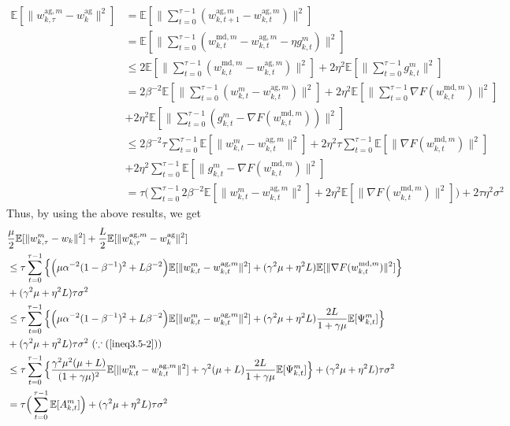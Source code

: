 \documentclass[11pt]{article}
\begin{document}
\begin{align*}
    \mathbb{E}[\|w_{k, \tau}^{\textrm{ag}, m} - w_k^{\textrm{ag}}\|^2] &= \mathbb{E}[\|\sum_{t=0}^{\tau-1}(w_{k, t+1}^{\textrm{ag}, m}-w_{k, t}^{\textrm{ag}, m})\|^2] \\
    &= \mathbb{E}[\|\sum_{t=0}^{\tau-1}(w_{k, t}^{\textrm{md}, m}-w_{k, t}^{\textrm{ag}, m}-\eta g_{k, t}^m)\|^2]\\
    &\leq 2\mathbb{E}[\|\sum_{t=0}^{\tau-1}(w_{k, t}^{\textrm{md}, m} - w_{k, t}^{\textrm{ag}, m})\|^2] + 2\eta^2\mathbb{E}[\|\sum_{t=0}^{\tau-1}g_{k, t}^m\|^2]\\
    &= 2\beta^{-2}\mathbb{E}[\|\sum_{t=0}^{\tau-1}(w_{k, t}^m - w_{k, t}^{\textrm{ag}, m})\|^2] + 2\eta^2\mathbb{E}[\|\sum_{t=0}^{\tau-1}\nabla F(w_{k, t}^{\textrm{md}, m})\|^2] \\
    &+ 2\eta^2\mathbb{E}[\|\sum_{t=0}^{\tau-1}(g_{k, t}^m - \nabla F(w_{k, t}^{\textrm{md}, m}))\|^2]\\
    &\leq 2\beta^{-2}\tau\sum_{t=0}^{\tau-1}\mathbb{E}[\|w_{k, t}^m-w_{k, t}^{\textrm{ag}, m}\|^2] + 2\eta^2\tau\sum_{t=0}^{\tau-1}\mathbb{E}[\|\nabla F(w_{k, t}^{\textrm{md}, m})\|^2]\\
    &+ 2\eta^2\sum_{t=0}^{\tau-1}\mathbb{E}[\|g_{k, t}^m - \nabla F(w_{k, t}^{\textrm{md}, m})\|^2]\\
    &= \tau \Big(\sum_{t=0}^{\tau-1} 2\beta^{-2}\mathbb{E}[\|w_{k, t}^m - w_{k, t}^{\textrm{ag}, m}\|^2] + 2\eta^2\mathbb{E}[\|\nabla F(w_{k, t}^{\textrm{md}, m})\|^2]\Big) +2\tau\eta^2\sigma^2
\end{align*}
Thus, by using the above results, we get
\begin{align*}
    &\frac{\mu}{2}\mathbb{E}[\|w_{k, \tau}^m - w_k\|^2] + \frac{L}{2} \mathbb{E}[\|w_{k, \tau}^{\textrm{ag}, m} - w_k^{\textrm{ag}}\|^2] \\
    &\leq \tau \sum_{t=0}^{\tau-1} \Big\{ \Big(\mu\alpha^{-2}(1-\beta^{-1})^2 + L\beta^{-2}\Big)\mathbb{E}[\|w_{k, t}^m - w_{k, t}^{\textrm{ag}, m}\|^2] + (\gamma^2\mu + \eta^2 L)\mathbb{E}[\|\nabla F(w_{k, t}^{\textrm{md}, m})\|^2]\Big\} \\
    &+ (\gamma^2\mu+\eta^2 L)\tau\sigma^2 \\
    &\leq \tau \sum_{t=0}^{\tau-1} \Big\{ \Big(\mu\alpha^{-2}(1-\beta^{-1})^2 + L\beta^{-2}\Big)\mathbb{E}[\|w_{k, t}^m - w_{k, t}^{\textrm{ag}, m}\|^2] + (\gamma^2\mu + \eta^2 L)\frac{2L}{1+\gamma\mu}\mathbb{E}[\Psi_{k, t}^m]\Big\} \\
    &+ (\gamma^2\mu+\eta^2 L)\tau\sigma^2 \textrm{ }(\because (\ref{ineq3.5-2})) \\
    &\leq \tau \sum_{t=0}^{\tau-1} \Big\{ \frac{\gamma^2\mu^2(\mu+L)}{(1+\gamma\mu)^2}\mathbb{E}[\|w_{k, t}^m - w_{k, t}^{\textrm{ag}, m}\|^2] + \gamma^2(\mu+L)\frac{2L}{1+\gamma\mu}\mathbb{E}[\Psi_{k, t}^m]\Big\} + (\gamma^2\mu+\eta^2 L)\tau\sigma^2 \\
    &= \tau \Big( \sum_{t=0}^{\tau-1} \mathbb{E}[A_{k, t}^m]\Big) + (\gamma^2\mu+\eta^2 L)\tau\sigma^2
\end{align*}
\end{document}
